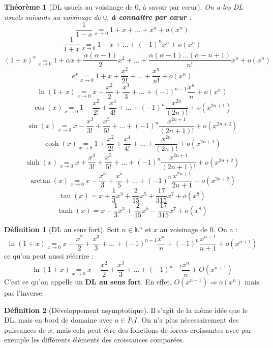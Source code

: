 \documentclass[french]{book}
\newcommand{\N}{\mathbb{N}}
\newcommand{\st}{^\star}
\theoremstyle{plain}
\newtheorem{thm}{Théorème}[chapter]
\theoremstyle{definition}
\newtheorem{dfn}{Définition}[chapter]
\theoremstyle{remark}
\begin{document}
\begin{thm}[DL usuels au voisinage de $0$, à savoir par cœur]
	On a les DL usuels suivants au voisinage de $0$, \textbf{à connaître par cœur} : $$\frac{1}{1-x} \underset{x\to 0}{=} 1+x+...+x^n+o(x^n)$$ $$\frac{1}{1+x} \underset{x\to 0}{=} 1-x+...+(-1)^n x^n+o(x^n)$$ $$(1+x)^{\alpha} \underset{x\to 0}{=} 1 + \alpha x + \frac{\alpha(\alpha -1)}{2}x^2 + ... + \frac{\alpha(\alpha -1)...(\alpha -n+1)}{n!}x^n +o(x^n)$$ $$e^x \underset{x\to 0}{=} 1 + x + \frac{x^2}{2!}+...+\frac{x^n}{n!} + o(x^n)$$ $$\ln(1+x) \underset{x\to 0}{=} x - \frac{x^2}{2} + \frac{x^3}{3}+...+ (-1)^{n-1}\frac{x^n}{n} + o(x^n)$$ $$\cos(x)\underset{x\to 0}{=}1-\frac{x^2}{2!}+\frac{x^4}{4!}+\ldots+(-1)^n\frac{x^{2n}}{(2n)!}+o(x^{2n+1})$$ $$\sin(x)\underset{x\to 0}{=}x-\frac{x^3}{3!}+\frac{x^5}{5!}+\ldots+(-1)^n\frac{x^{2n+1}}{(2n+1)!}+o(x^{2n+2})$$ $$\cosh(x)\underset{x\to 0}{=}1+\frac{x^2}{2!}+\frac{x^4}{4!}+\ldots+\frac{x^{2n}}{(2n)!}+o(x^{2n+1})$$ $$\sinh(x)\underset{x\to 0}{=}x+\frac{x^3}{3!}+\frac{x^5}{5!}+\ldots+(-1)^n\frac{x^{2n+1}}{(2n+1)!}+o(x^{2n+2})$$ $$\arctan(x)\underset{x\to 0}{=}x-\frac{x^3}{3}+\frac{x^5}{5}+\ldots+(-1)^n\frac{x^{2n+1}}{2n+1}+o(x^{2n+2})$$ $$\tan(x)=x+\frac{1}{3}x^3+\frac{2}{15}x^5+\frac{17}{315}x^7+o(x^8)$$ $$\tanh(x)=x-\frac{1}{3}x^3+\frac{2}{15}x^5-\frac{17}{315}x^7+o(x^8)$$
\end{thm}
\begin{dfn}[DL au sens fort]
	Soit $n\in\N\st$ et $x$ au voisinage de $0$. On a : $$\ln(1+x) \underset{x\to 0}{=} x - \frac{x^2}{2} + \frac{x^3}{3}+...+ (-1)^{n-1}\frac{x^n}{n} + (-1)^{n}\frac{x^{n+1}}{n+1}+o(x^{n+1})$$ ce qu'on peut aussi réécrire : $$\ln(1+x) \underset{x\to 0}{=} x - \frac{x^2}{2} + \frac{x^3}{3}+...+ (-1)^{n-1}\frac{x^n}{n} + O(x^{n+1})$$ C'est ce qu'on appelle un \textbf{DL au sens fort}. En effet, $O(x^{n+1})\Longrightarrow o(x^n)$ mais pas l'inverse.
\end{dfn}
\begin{dfn}[Développement asymptotique]
	Il s'agit de la même idée que le DL, mais en bord de domaine avec $a\in\overline{I}\setminus I$. On n'a plus nécessairement des puissances de $x$, mais cela peut être des fonctions de forces croissantes avec par exemple les différents éléments des croissances comparées.
\end{dfn}
\end{document}
